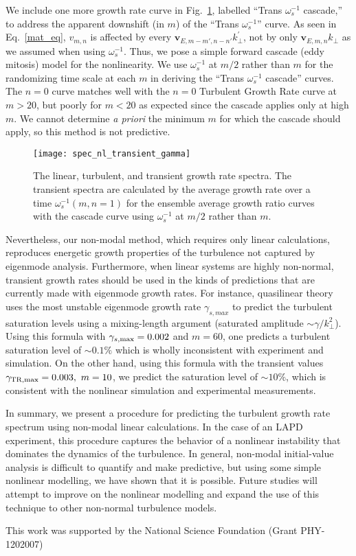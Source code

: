 \documentclass[letter,scriptaddress,twocolumn, prl,showkeys]{revtex4}
\begin{document}
We include one more growth rate curve in Fig.~\ref{spec_nl_transient_gamma}, labelled ``Trans $\omega_s^{-1}$ cascade,'' to address the apparent downshift (in $m$) of
the ``Trans $\omega_s^{-1}$'' curve. As seen in Eq.~\ref{mat_eq}, $v_{m,n}$ is affected by every $\mathbf{v}_{E,m-m',n-n'} k^{'}_\perp$, not by only $\mathbf{v}_{E,m,n} k_\perp$ as we
assumed when using $\omega_s^{-1}$. Thus, we pose a simple forward cascade (eddy mitosis) model for the nonlinearity.
We use $\omega_s^{-1}$ at $m/2$ rather than $m$ for the randomizing time scale at each $m$ in deriving the ``Trans $\omega_s^{-1}$ cascade'' curves. 
The $n=0$ curve matches well with the $n=0$ Turbulent Growth Rate curve at $m>20$, but poorly for $m<20$ as expected since the cascade applies only at high $m$. 
We cannot determine \emph{a priori} the minimum $m$ for which the cascade should apply, so this method is not predictive.

\begin{figure}
\centerline{\texttt{[image: spec\_nl\_transient\_gamma]}}
\caption{The linear, turbulent, and transient growth rate spectra. The transient spectra are calculated by the average growth rate over a time $\omega_s^{-1}(m,n=1)$ for the ensemble average
growth ratio curves with the cascade curve using $\omega_s^{-1}$ at $m/2$ rather than $m$.}
\label{spec_nl_transient_gamma}
\end{figure}

Nevertheless, our non-modal method, which requires only linear calculations, reproduces energetic growth properties of the turbulence not captured by eigenmode analysis.
Furthermore, when linear systems are highly non-normal, transient growth rates should be used in the kinds of predictions that are currently made with eigenmode growth rates. 
For instance, quasilinear theory uses the most unstable eigenmode growth rate $\gamma_{s,max}$ to predict the turbulent saturation levels using a mixing-length argument 
(saturated amplitude $\sim \gamma/k_\perp^2$). 
Using this formula with $\gamma_{s,\rm{max}} = 0.002$ and $m=60$, one predicts a turbulent saturation level of $\sim 0.1 \%$ which is wholly inconsistent with experiment and simulation. 
On the other hand, using this formula with the transient values $\gamma_{\rm{TR, max}} = 0.003, \ m=10$, we predict the saturation level of $\sim 10 \%$,
which is consistent with the nonlinear simulation and experimental measurements.

In summary, we present a procedure for predicting the turbulent growth rate spectrum using non-modal linear calculations. 
In the case of an LAPD experiment, this procedure captures the behavior of a nonlinear instability that dominates the dynamics of the turbulence.  In general,
non-modal initial-value analysis is difficult to quantify and make predictive, but using some simple nonlinear modelling, we have shown
that it is possible. Future studies will attempt to improve on the nonlinear modelling and expand the use of this technique to other non-normal turbulence models.  

This work was supported by the National Science Foundation (Grant PHY-1202007)




\end{document}
